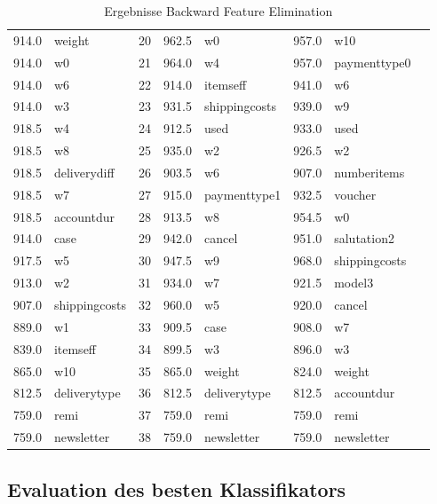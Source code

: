 \begin{table}[]
\begin{tabular*}{\textwidth}{c @{\extracolsep{\fill}} lllllll}
914.0 & weight & 20 & 962.5 & w0 & 957.0 & w10\\
914.0 & w0 & 21 & 964.0 & w4 & 957.0 & paymenttype0 \\
914.0 & w6 & 22 & 914.0 & itemseff & 941.0 & w6\\
914.0 & w3 & 23 & 931.5 & shippingcosts & 939.0 & w9\\
918.5 & w4 & 24 & 912.5 & used & 933.0 & used\\
918.5 & w8 & 25 & 935.0 & w2 & 926.5 & w2\\
918.5 & deliverydiff & 26 & 903.5 & w6 & 907.0 & numberitems\\
918.5 & w7 & 27 & 915.0 & paymenttype1 & 932.5 & voucher\\
918.5 & accountdur & 28 & 913.5 & w8 & 954.5 & w0\\
914.0 & case & 29 & 942.0 & cancel & 951.0 & salutation2\\
917.5 & w5 & 30 & 947.5 & w9 & 968.0 & shippingcosts\\
913.0 & w2 & 31 & 934.0 & w7 & 921.5 & model3\\
907.0 & shippingcosts & 32 & 960.0 & w5 & 920.0 & cancel\\
889.0 & w1 & 33 & 909.5 & case & 908.0 & w7\\
839.0 & itemseff & 34 & 899.5 & w3 & 896.0 & w3\\
865.0 & w10 & 35 & 865.0 & weight & 824.0 & weight\\
812.5 & deliverytype & 36 & 812.5 & deliverytype & 812.5 & accountdur\\
759.0 & remi & 37 & 759.0 & remi & 759.0 & remi\\
759.0 & newsletter & 38 & 759.0 & newsletter & 759.0 & newsletter\\
\bottomrule
\end{tabular*}
\caption{Ergebnisse Backward Feature Elimination}
\label{table: Backward}
\end{table}
\FloatBarrier
 
 
\subsection{Evaluation des besten Klassifikators}

